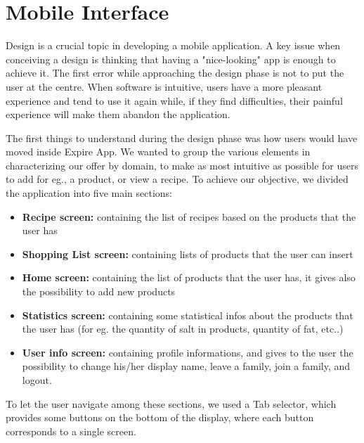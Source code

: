 \section{Mobile Interface}
Design is a crucial topic in developing a mobile application. A key issue when
conceiving a design is thinking that having a "nice-looking" app is enough to achieve it. The first error while approaching the design phase is not to put the user at the centre. When software is intuitive, users have a more pleasant experience and tend to use it again while, if they find difficulties, their painful experience will make them abandon the application.\newline

The first things to understand during the design phase was how users would have moved inside Expire App. We wanted to group the various elements in characterizing our offer by domain, to make as most intuitive as possible
for users to add for eg., a product, or view a recipe. To achieve our objective, we divided the application into five main sections:

\begin{itemize}
    \item \textbf{Recipe screen: } containing the list of recipes based on the products that the user has
    
    \item \textbf{Shopping List screen: } containing lists of products that the user can insert
    
    \item \textbf{Home screen: } containing the list of products that the user has, it gives also the possibility to add new products
    
    \item \textbf{Statistics screen: } containing some statistical infos about the products that the user has (for eg. the quantity of salt in products, quantity of fat, etc..)
    
    \item \textbf{User info screen: } containing profile informations, and gives to the user the possibility to change his/her display name, leave a family, join a family, and logout.
\end{itemize}

To let the user navigate among these sections, we used a Tab selector, which
provides some buttons on the bottom of the display, where each button corresponds to a single screen.\newline


